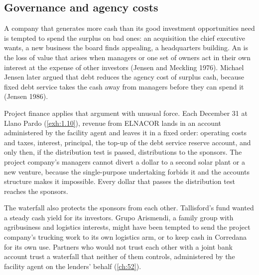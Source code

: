 \subsection{Governance and agency costs}\label{ssec:2.5.2}

A company that generates more cash than its good investment opportunities need is tempted to spend the surplus on bad ones: an acquisition the chief executive wants, a new business the board finds appealing, a headquarters building. An  is the loss of value that arises when managers or one set of owners act in their own interest at the expense of other investors (Jensen and Meckling 1976). Michael Jensen later argued that debt reduces the agency cost of surplus cash, because fixed debt service takes the cash away from managers before they can spend it (Jensen 1986).

Project finance applies that argument with unusual force. Each December 31 at Llano Pardo (\cref{exh:1.10}), revenue from ELNACOR lands in an account administered by the facility agent and leaves it in a fixed order: operating costs and taxes, interest, principal, the top-up of the debt service reserve account, and only then, if the distribution test is passed, distributions to the sponsors. The project company's managers cannot divert a dollar to a second solar plant or a new venture, because the single-purpose undertaking forbids it and the accounts structure makes it impossible. Every dollar that passes the distribution test reaches the sponsors.

The waterfall also protects the sponsors from each other. Tallisford's fund wanted a steady cash yield for its investors. Grupo Arismendi, a family group with agribusiness and logistics interests, might have been tempted to send the project company's trucking work to its own logistics arm, or to keep cash in Corredana for its own use. Partners who would not trust each other with a joint bank account trust a waterfall that neither of them controls, administered by the facility agent on the lenders' behalf (\cref{ch:52}).

